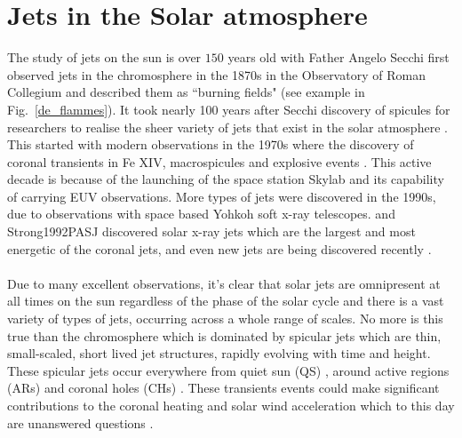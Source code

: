 \documentclass[12pt]{ociamthesis}
\newcommand{\np}{\\ \\}
\begin{document}
\section{Jets in the Solar atmosphere}
\label{sec:spicule-jets}
The study of jets on the sun is over $150$ years old with Father Angelo Secchi first observed jets in the chromosphere in the 1870s in the Observatory of Roman Collegium and described them as ``burning fields" (see example in Fig.~\ref{de_flammes}). It took nearly 100 years after Secchi discovery of spicules for researchers to realise the sheer variety of jets that exist in the solar atmosphere \citep{Raouafi2016}. This started with modern observations in the 1970s where the discovery of coronal transients in Fe XIV, macrospicules and explosive events \citep{Demastus1973, Bohlin1975ApJ197L133B, Withbroe1976ApJ, Brueckner1980HiA}. This active decade is because of the launching of the space station Skylab and its capability of carrying EUV observations. More types of jets were discovered in the 1990s, due to observations with space based Yohkoh soft x-ray telescopes. \cite{Shibata1992PASJ} and {Strong1992PASJ} discovered solar x-ray jets which are the largest and most energetic of the coronal jets, and even new jets are being discovered recently \citep{Cho2019ApJ884L38C}. \np
%
Due to many excellent observations, it's clear that solar jets are omnipresent at all times on the sun regardless of the phase of the solar cycle and there is a vast variety of types of jets, occurring across a whole range of scales. No more is this true than the chromosphere which is dominated by spicular jets which are thin, small-scaled, short lived jet structures, rapidly evolving with time and height. These spicular jets occur everywhere from quiet sun (QS) \citep{Pontieu2007astroph2081D,Rouppe2007ApJ660L169R,Pereira2012,Pereira2014ApJ}, around active regions (ARs) \citep{Pontieu2007astroph2081D,Pereira2012,Rouppe2013ApJ77656R,Gafeira2017ApJS2296G} and coronal holes (CHs) \citep{Yamauchi2005ApJ629572Y,Moreno2008ApJ673L211M,Pereira2012,Young2015ApJ801124Y}.  These transients events could make significant contributions to the coronal heating and solar wind acceleration which to this day are unanswered questions \citep{Martinez-Sykora2017, Pontieu2017ApJ, Samanta2019Sci, Zuo2019AcASn, Bale2019Natur}. \np
%
\end{document}
